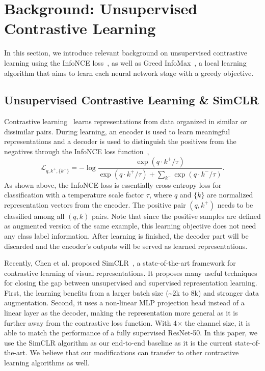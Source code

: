 \section{Background: Unsupervised Contrastive Learning}

In this section, we introduce relevant background on unsupervised contrastive learning using the
InfoNCE loss~\cite{cpc}, as well as  Greed InfoMax~\cite{e2e2e}, a local learning algorithm that
aims to learn each neural network stage with a greedy objective.

\subsection{Unsupervised Contrastive Learning \& SimCLR}

Contrastive learning~\cite{cpc} learns representations from data organized in similar or dissimilar
pairs. During  learning, an encoder is used to learn meaningful representations and a decoder is
used to distinguish the positives from the negatives through the InfoNCE loss function~\cite{cpc},
\begin{equation}
\mathcal{L}_{q, k^+, \{k^-\}} = -\log \frac{\exp(q{\cdot}k^+ / \tau)}{\exp(q{\cdot}k^+ / \tau) +
{\displaystyle\sum_{k^-}}\exp(q{\cdot}k^-  / \tau)}.
\label{eq:infonce}
\end{equation}
As shown above, the InfoNCE loss is essentially cross-entropy loss for classification with a
temperature scale factor $\tau$, where $q$ and $\{k\}$ are normalized representation vectors from
the encoder. The positive pair $(q, k^+)$ needs to be classified among all $(q, k)$ pairs. Note that
since the positive samples are defined as augmented version of the same example, this learning
objective does not need any class label information. After learning is finished, the decoder part
will be discarded and the encoder's outputs will be served as learned representations.

Recently, Chen et al. proposed SimCLR~\cite{simclr}, a state-of-the-art framework for contrastive
learning of visual representations. It proposes many useful techniques for closing the gap between
unsupervised and supervised representation learning. First, the learning benefits from a larger
batch size (\textasciitilde 2k to 8k) and stronger data augmentation. Second, it uses a non-linear
MLP projection head instead of a linear layer as the decoder, making the representation more general
as it is further away from the contrastive loss function. With 4$\times$ the channel size, it is
able to match the performance of a fully supervised ResNet-50. In this paper, we use the SimCLR
algorithm as our end-to-end baseline as it is the current state-of-the-art. We believe that our
modifications can transfer to other contrastive learning algorithms as well.

